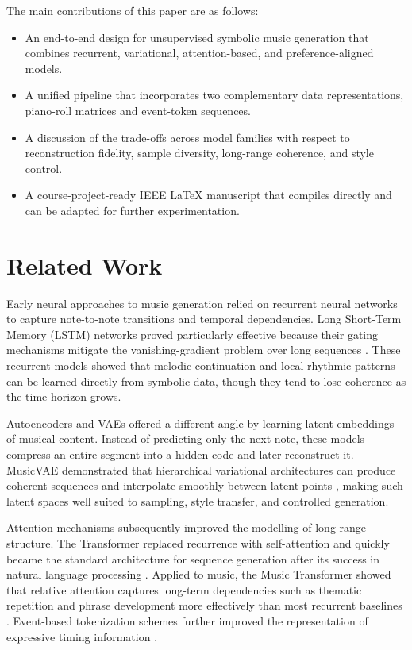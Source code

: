 \documentclass[conference]{IEEEtran}
\begin{document}
The main contributions of this paper are as follows:
\begin{itemize}
\item An end-to-end design for unsupervised symbolic music generation that combines recurrent, variational, attention-based, and preference-aligned models.
\item A unified pipeline that incorporates two complementary data representations, piano-roll matrices and event-token sequences.
\item A discussion of the trade-offs across model families with respect to reconstruction fidelity, sample diversity, long-range coherence, and style control.
\item A course-project-ready IEEE \LaTeX{} manuscript that compiles directly and can be adapted for further experimentation.
\end{itemize}

\section{Related Work}
Early neural approaches to music generation relied on recurrent neural networks to capture note-to-note transitions and temporal dependencies. Long Short-Term Memory (LSTM) networks proved particularly effective because their gating mechanisms mitigate the vanishing-gradient problem over long sequences \cite{lstm}. These recurrent models showed that melodic continuation and local rhythmic patterns can be learned directly from symbolic data, though they tend to lose coherence as the time horizon grows.

Autoencoders and VAEs offered a different angle by learning latent embeddings of musical content. Instead of predicting only the next note, these models compress an entire segment into a hidden code and later reconstruct it. MusicVAE demonstrated that hierarchical variational architectures can produce coherent sequences and interpolate smoothly between latent points \cite{musicvae}, making such latent spaces well suited to sampling, style transfer, and controlled generation.

Attention mechanisms subsequently improved the modelling of long-range structure. The Transformer replaced recurrence with self-attention and quickly became the standard architecture for sequence generation after its success in natural language processing \cite{attention}. Applied to music, the Music Transformer showed that relative attention captures long-term dependencies such as thematic repetition and phrase development more effectively than most recurrent baselines \cite{musictransformer}. Event-based tokenization schemes further improved the representation of expressive timing information \cite{timewithfeeling}.
\end{document}
